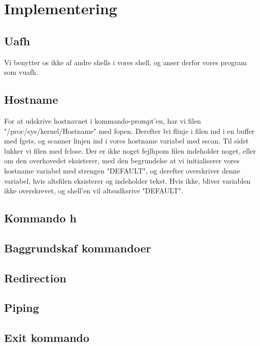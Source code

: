 \section{Implementering}
\subsection{Uafh}


Vi benytter os ikke af andre shells i vores shell, og anser derfor vores program som v uafh. 

\subsection{Hostname}
For at udskrive hostnavnet i kommando-prompt'en, har vi  filen "/proc/sys/kernel/Hostname" med fopen. Derefter l vi f linje i filen ind i en buffer med fgets, og scanner linjen ind i vores hostname variabel med sscan. Til sidst lukker vi filen med fclose. Der er ikke noget fejlh p\å om filen indeholder noget, eller om den overhovedet eksisterer, med den begrundelse at vi initialiserer vores hostname variabel med strengen "DEFAULT", og derefter overskriver denne variabel, hvis alts\å filen eksisterer og indeholder tekst. Hvis ikke, bliver variablen ikke overskrevet, og shell'en vil alts\å udksrive "DEFAULT".

\subsection{Kommando h}

\subsection{Baggrundsk af kommandoer}

\subsection{Redirection}

\subsection{Piping}

\subsection{Exit kommando}

